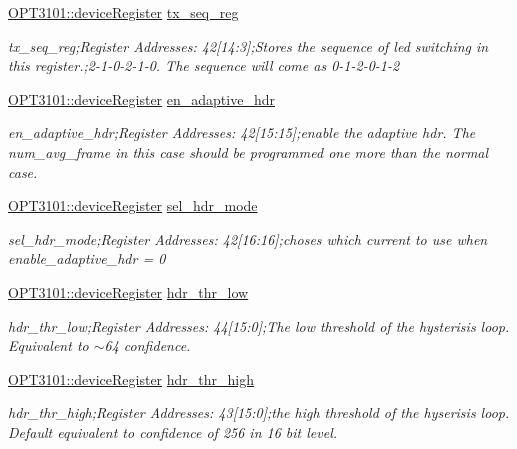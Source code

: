 \begin{DoxyCompactItemize}
\mbox{\hyperlink{class_o_p_t3101_1_1device_register}{O\+P\+T3101\+::device\+Register}} \mbox{\hyperlink{class_o_p_t3101_1_1registers_a6cd0b1e1ec6febc0e4ec775e4c639d4c}{tx\+\_\+seq\+\_\+reg}}
\begin{DoxyCompactList}\small\item\em tx\+\_\+seq\+\_\+reg;Register Addresses\+: 42\mbox{[}14\+:3\mbox{]};Stores the sequence of led switching in this register.;2-\/1-\/0-\/2-\/1-\/0. The sequence will come as 0-\/1-\/2-\/0-\/1-\/2 \end{DoxyCompactList}\item 
\mbox{\hyperlink{class_o_p_t3101_1_1device_register}{O\+P\+T3101\+::device\+Register}} \mbox{\hyperlink{class_o_p_t3101_1_1registers_ab14fd3da3a7aee59227f3a0b2c6ed653}{en\+\_\+adaptive\+\_\+hdr}}
\begin{DoxyCompactList}\small\item\em en\+\_\+adaptive\+\_\+hdr;Register Addresses\+: 42\mbox{[}15\+:15\mbox{]};enable the adaptive hdr. The num\+\_\+avg\+\_\+frame in this case should be programmed one more than the normal case. \end{DoxyCompactList}\item 
\mbox{\hyperlink{class_o_p_t3101_1_1device_register}{O\+P\+T3101\+::device\+Register}} \mbox{\hyperlink{class_o_p_t3101_1_1registers_a1f8f226c3e13479d0dafeb402d35d519}{sel\+\_\+hdr\+\_\+mode}}
\begin{DoxyCompactList}\small\item\em sel\+\_\+hdr\+\_\+mode;Register Addresses\+: 42\mbox{[}16\+:16\mbox{]};choses which current to use when enable\+\_\+adaptive\+\_\+hdr = \textquotesingle{}0\textquotesingle{} \end{DoxyCompactList}\item 
\mbox{\hyperlink{class_o_p_t3101_1_1device_register}{O\+P\+T3101\+::device\+Register}} \mbox{\hyperlink{class_o_p_t3101_1_1registers_a440d873648ba4fe03c3690e18953610d}{hdr\+\_\+thr\+\_\+low}}
\begin{DoxyCompactList}\small\item\em hdr\+\_\+thr\+\_\+low;Register Addresses\+: 44\mbox{[}15\+:0\mbox{]};The low threshold of the hysterisis loop. Equivalent to $\sim$64 confidence. \end{DoxyCompactList}\item 
\mbox{\hyperlink{class_o_p_t3101_1_1device_register}{O\+P\+T3101\+::device\+Register}} \mbox{\hyperlink{class_o_p_t3101_1_1registers_a9f703a5eeb8b45b076487ee38f56c38b}{hdr\+\_\+thr\+\_\+high}}
\begin{DoxyCompactList}\small\item\em hdr\+\_\+thr\+\_\+high;Register Addresses\+: 43\mbox{[}15\+:0\mbox{]};the high threshold of the hyserisis loop. Default equivalent to confidence of 256 in 16 bit level. \end{DoxyCompactList}\item 

\end{DoxyCompactItemize}

